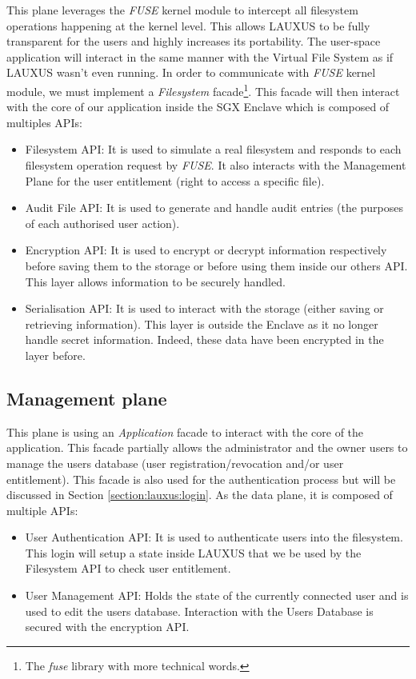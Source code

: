 \documentclass[../main.tex]{subfiles}
\begin{document}
\par This plane leverages the \textit{FUSE} kernel module to intercept all filesystem operations happening at the kernel level. This allows LAUXUS to be fully transparent for the users and highly increases its portability. The user-space application will interact in the same manner with the Virtual File System as if LAUXUS wasn't even running. In order to communicate with \textit{FUSE} kernel module, we must implement a \textit{Filesystem} facade\footnote{The \textit{fuse} library with more technical words.}. This facade will then interact with the core of our application inside the SGX Enclave which is composed of multiples APIs:
\begin{itemize}
    \item Filesystem API: It is used to simulate a real filesystem and responds to each filesystem operation request by \textit{FUSE}. It also interacts with the Management Plane for the user entitlement (right to access a specific file).
    \item Audit File API: It is used to generate and handle audit entries (the purposes of each authorised user action).
    \item Encryption API: It is used to encrypt or decrypt information respectively before saving them to the storage or before using them inside our others API. This layer allows information to be securely handled.
    \item Serialisation API: It is used to interact with the storage (either saving or retrieving information). This layer is outside the Enclave as it no longer handle secret information. Indeed, these data have been encrypted in the layer before.
\end{itemize}


\subsection{Management plane}
\label{section:lauxus:architecture_mgmntplane}

\par This plane is using an \textit{Application} facade to interact with the core of the application. This facade partially allows the administrator and the owner users to manage the users database (user registration/revocation and/or user entitlement). This facade is also used for the authentication process but will be discussed in Section \ref{section:lauxus:login}. As the data plane, it is composed of multiple APIs:
\begin{itemize}
    \item User Authentication API: It is used to authenticate users into the filesystem. This login will setup a state inside LAUXUS that we be used by the Filesystem API to check user entitlement.
    \item User Management API: Holds the state of the currently connected user and is used to edit the users database. Interaction with the Users Database is secured with the encryption API.
\end{itemize}
\end{document}
